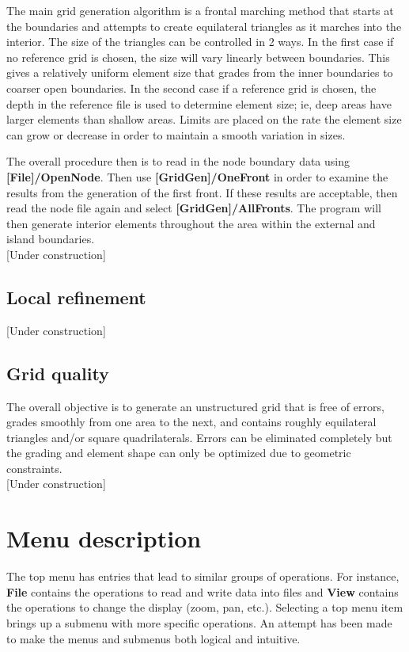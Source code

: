 \documentclass{article}
\begin{document}
The main grid generation algorithm is a frontal marching method that starts at the boundaries and attempts to
create equilateral triangles as it marches into the interior.  The size of the triangles can be controlled in 2 ways.
In the first case if no reference grid is chosen, the size will vary linearly between boundaries. This gives a relatively 
uniform element size that grades from the inner boundaries to coarser open boundaries. In the second case if a
reference grid is chosen, the depth in the reference file is used to determine element size; ie, deep areas have larger
elements than shallow areas. Limits are placed on the rate the element size can grow or decrease in order to maintain a
smooth variation in sizes.

The overall procedure then is to read in the node boundary data using \textbf{[File]/OpenNode}. Then use
\textbf{[GridGen]/OneFront} in order to examine the results from the generation of the first front. If these results are
acceptable, then read the node file again and select \textbf{[GridGen]/AllFronts}. The program will then generate interior
elements throughout the area within the external and island boundaries. \\

[Under construction]

\subsection{Local refinement}

[Under construction]

\subsection{Grid quality}

The overall objective is to generate an unstructured grid that is free of errors, grades smoothly
from one area to the next, and contains roughly equilateral triangles and/or square quadrilaterals. 
Errors can be eliminated completely  but the grading and element shape can only be optimized due to geometric 
constraints.\\

[Under construction]

\section{Menu description}

The top menu has entries that lead to similar groups of operations. For instance, \textbf{File} contains the operations
to read and write data into files and  \textbf{View} contains the operations to change the display (zoom, pan, etc.).
Selecting a top menu item brings up a submenu with more specific operations. An attempt has been made to make
the menus and submenus both logical and intuitive.
\end{document}
